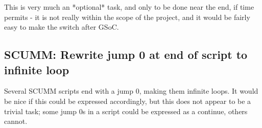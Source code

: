 This is very much an *optional* task, and only to be done near the end, if time permits - it is not really within the scope of the project, and it would be fairly easy to make the switch after GSoC.

\subsection{SCUMM: Rewrite jump 0 at end of script to infinite loop}
Several SCUMM scripts end with a jump 0, making them infinite loops. It would be nice if this could be expressed accordingly, but this does not appear to be a trivial task; some jump 0s in a script could be expressed as a continue, others cannot.
